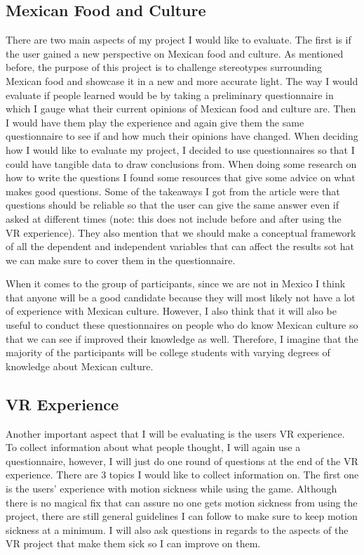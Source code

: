 \documentclass[11pt,twocolumn]{article}
\begin{document}
\subsection{Mexican Food and Culture} 
There are two main aspects of my project I would like to evaluate. The first is if the user gained a new perspective on Mexican food and culture. As mentioned before, the purpose of this project is to challenge stereotypes surrounding Mexican food and showcase it in a new and more accurate light. The way I would evaluate if people learned would be by taking a preliminary questionnaire in which I gauge what their current opinions of Mexican food and culture are. Then I would have them play the experience and again give them the same questionnaire to see if and how much their opinions have changed. When deciding how I would like to evaluate my project, I decided to use questionnaires so that I could have tangible data to draw conclusions from. When doing some research on how to write the questions I found some resources that give some advice on what makes good questions. Some of the takeaways I got from the article were that questions should be reliable so that the user can give the same answer even if asked at different times\cite{designQuestionaire2006} (note: this does not include before and after using the VR experience). They also mention that we should make a conceptual framework of all the dependent and independent variables that can affect the results sot hat we can make sure to cover them in the questionnaire. 

When it comes to the group of participants, since we are not in Mexico I think that anyone will be a good candidate because they will most likely not have a lot of experience with Mexican culture. However, I also think that it will also be useful to conduct these questionnaires on people who do know Mexican culture so that we can see if improved their knowledge as well. Therefore, I imagine that the majority of the participants will be college students with varying degrees of knowledge about Mexican culture.
 
\subsection{VR Experience}
Another important aspect that I will be evaluating is the users VR experience. To collect information about what people thought, I will again use a questionnaire, however, I will just do one round of questions at the end of the VR experience. There are 3 topics I would like to collect information on. The first one is the users’ experience with motion sickness while using the game. Although there is no magical fix that can assure no one gets motion sickness from using the project, there are still general guidelines I can follow to make sure to keep motion sickness at a minimum. I will also ask questions in regards to the aspects of the VR project that make them sick so I can improve on them.
\end{document}
